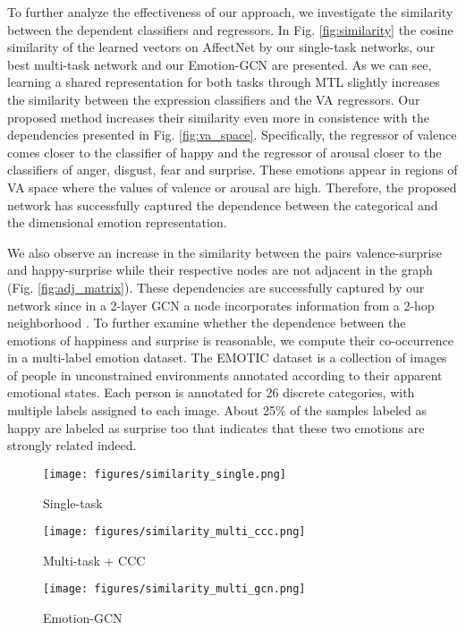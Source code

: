 \documentclass[a4paper, 10pt, conference]{ieeeconf}      \usepackage{FG2021}
\begin{document}
To further analyze the effectiveness of our approach, we investigate the similarity between the dependent classifiers and regressors. In Fig. \ref{fig:similarity} the cosine similarity of the learned vectors on AffectNet by our single-task networks, our best multi-task network and our Emotion-GCN are presented. As we can see, learning a shared representation for both tasks through MTL slightly increases the similarity between the expression classifiers and the VA regressors. Our proposed method increases their similarity even more in consistence with the dependencies presented in Fig. \ref{fig:va_space}. Specifically, the regressor of valence comes closer to the classifier of happy and the regressor of arousal closer to the classifiers of anger, disgust, fear and surprise. These emotions appear in regions of VA space where the values of valence or arousal are high. Therefore, the proposed network has successfully captured the dependence between the categorical and the dimensional emotion representation.

We also observe an increase in the similarity between the pairs valence-surprise and happy-surprise while their respective nodes are not adjacent in the graph (Fig. \ref{fig:adj_matrix}). These dependencies are successfully captured by our network since in a 2-layer GCN a node incorporates information from a 2-hop neighborhood \cite{derr2018signed}. To further examine whether the dependence between the emotions of happiness and surprise is reasonable, we compute their co-occurrence in a multi-label emotion dataset. The EMOTIC dataset \cite{kosti2017emotic} is a collection of images of people in unconstrained environments annotated according to their apparent emotional states. Each person is annotated for 26 discrete categories, with multiple labels assigned to each image. About 25\% of the samples labeled as happy are labeled as surprise too that indicates that these two emotions are strongly related indeed.

\begin{figure*}[t]
     \centering
     \begin{subfigure}[b]{0.32\textwidth}
         \centering
         \texttt{[image: figures/similarity\_single.png]}
         \caption{Single-task}
         \label{fig:similarity_single}
     \end{subfigure}
     \hfill
     \begin{subfigure}[b]{0.32\textwidth}
         \centering
         \texttt{[image: figures/similarity\_multi\_ccc.png]}
         \caption{Multi-task + CCC}
         \label{fig:similarity_multi}
     \end{subfigure}
     \hfill
     \begin{subfigure}[b]{0.32\textwidth}
         \centering
         \texttt{[image: figures/similarity\_multi\_gcn.png]}
         \caption{Emotion-GCN}
         \label{fig:similarity_gcn}
     \end{subfigure}
    \caption{Visualization of the cosine similarity between the learned classifiers and regressors by our models on AffectNet.}
    \label{fig:similarity}
\end{figure*}
\end{document}
